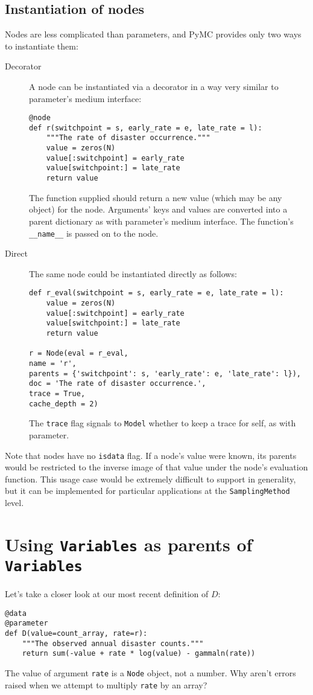 \subsection{Instantiation of nodes}
Nodes are less complicated than parameters, and PyMC provides only two ways to instantiate them:
\begin{description}
    \item[Decorator] A node can be instantiated via a decorator in a way very similar to parameter's medium interface:
\begin{verbatim}
@node
def r(switchpoint = s, early_rate = e, late_rate = l):
    """The rate of disaster occurrence."""
    value = zeros(N)
    value[:switchpoint] = early_rate
    value[switchpoint:] = late_rate
    return value
\end{verbatim}
The function supplied should return a new value (which may be any object) for the node. Arguments' keys and values are converted into a parent dictionary as with parameter's medium interface. The function's \texttt{\_\_name\_\_} is passed on to the node.
    \item[Direct] The same node could be instantiated directly as follows:
\begin{verbatim}
def r_eval(switchpoint = s, early_rate = e, late_rate = l):
    value = zeros(N)
    value[:switchpoint] = early_rate
    value[switchpoint:] = late_rate
    return value

r = Node(eval = r_eval, 
name = 'r',
parents = {'switchpoint': s, 'early_rate': e, 'late_rate': l}),
doc = 'The rate of disaster occurrence.',
trace = True,
cache_depth = 2)
\end{verbatim}
The \texttt{trace} flag signals to \texttt{Model} whether to keep a trace for self, as with parameter.
\end{description}

Note that nodes have no \texttt{isdata} flag. If a node's value were known, its parents would be restricted to the inverse image of that value under the node's evaluation function. This usage case would be extremely difficult to support in generality, but it can be implemented for particular applications at the \texttt{SamplingMethod} level.

\section{Using \texttt{Variables} as parents of \texttt{Variables}}

Let's take a closer look at our most recent definition of $D$:
\begin{verbatim}
@data
@parameter
def D(value=count_array, rate=r):
    """The observed annual disaster counts."""
    return sum(-value + rate * log(value) - gammaln(rate))
\end{verbatim}
The value of argument \texttt{rate} is a \texttt{Node} object, not a number. Why aren't errors raised when we attempt to multiply \texttt{rate} by an array?

